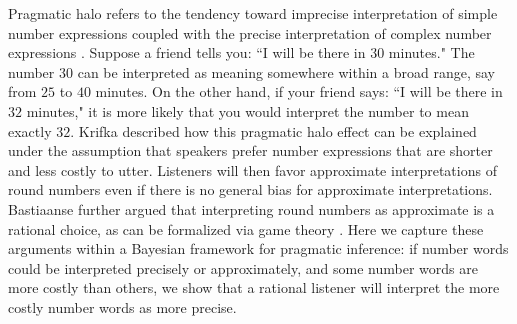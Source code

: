 \documentclass{article} %
\begin{document}
Pragmatic halo refers to the tendency toward imprecise interpretation of simple number expressions coupled with the precise interpretation of complex number expressions \cite{lasersohn1999pragmatic}. Suppose a friend tells you: ``I will be there in $30$ minutes." The number $30$ can be interpreted as meaning somewhere within a broad range, say from $25$ to $40$ minutes. On the other hand, if your friend says: ``I will be there in $32$ minutes," it is more likely that you would interpret the number to mean exactly $32$. 
Krifka \cite{krifka2007approximate} described how this pragmatic halo effect can be explained under the assumption that speakers prefer number expressions that are shorter and less costly to utter. Listeners will then favor approximate interpretations of round numbers even if there is no general bias for approximate interpretations. Bastiaanse \cite{bastiaanse2011rationality} further argued that interpreting round numbers as approximate is a rational choice, as can be formalized via game theory \cite{jager2008game}. 
Here we capture these arguments within a Bayesian framework for pragmatic inference: if number words could be interpreted precisely or approximately, and some number words are more costly than others, we show that a rational listener will interpret the more costly number words as more precise.
\end{document}

